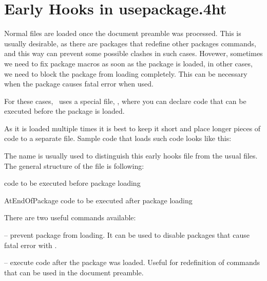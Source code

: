 
\section{Early Hooks in usepackage.4ht}

Normal  files are loaded once the document preamble was processed. 
This is usually desirable, as there are packages that redefine other packages
commands, and this way can prevent some possible clashes in such cases. 
Hovewer, sometimes we need to fix package macros as soon as the package is loaded,
in other cases, we need to block the package from loading completely. This can be 
necessary when the package causes fatal error when used.

For these cases, \texfourht\ uses a special file, ,
where you can declare code that can be executed before the package is loaded.

As it is loaded multiple times it is best to keep it short and place longer pieces
of code to a separate file. Sample code that loads such code looks like this:

\begin{texsource}
\end{texsource}

The  name is usually used to distinguish this early hooks file
from the usual  files. The general structure of the  file 
is following:

\begin{texsource}
code to be executed before package loading

\:AtEndOfPackage{
code to be executed after package loading
}
\end{texsource}

There are two useful commands available:

 -- prevent package from loading. It can be used to 
disable packages that cause fatal error with \texfourht.

 -- execute code after the package was loaded. 
Useful for redefinition of commands that can be used in the document preamble.

